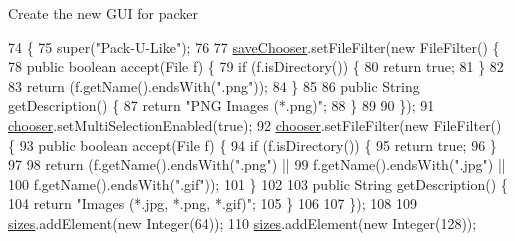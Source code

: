 Create the new G\+UI for packer 
\begin{DoxyCode}
74                     \{
75         super(\textcolor{stringliteral}{"Pack-U-Like"});
76         
77         \mbox{\hyperlink{classorg_1_1newdawn_1_1slick_1_1tools_1_1packulike_1_1_packer_a29ef57b7ec0b9ffa079a40890b9ac78b}{saveChooser}}.setFileFilter(\textcolor{keyword}{new} FileFilter() \{
78             \textcolor{keyword}{public} \textcolor{keywordtype}{boolean} accept(File f) \{
79                 \textcolor{keywordflow}{if} (f.isDirectory()) \{
80                     \textcolor{keywordflow}{return} \textcolor{keyword}{true};
81                 \}
82                 
83                 \textcolor{keywordflow}{return} (f.getName().endsWith(\textcolor{stringliteral}{".png"}));
84             \}
85 
86             \textcolor{keyword}{public} String getDescription() \{
87                 \textcolor{keywordflow}{return} \textcolor{stringliteral}{"PNG Images (*.png)"};
88             \}
89             
90         \});
91         \mbox{\hyperlink{classorg_1_1newdawn_1_1slick_1_1tools_1_1packulike_1_1_packer_aee4fbd6c801ae2b56690fc2994e73e52}{chooser}}.setMultiSelectionEnabled(\textcolor{keyword}{true});
92         \mbox{\hyperlink{classorg_1_1newdawn_1_1slick_1_1tools_1_1packulike_1_1_packer_aee4fbd6c801ae2b56690fc2994e73e52}{chooser}}.setFileFilter(\textcolor{keyword}{new} FileFilter() \{
93             \textcolor{keyword}{public} \textcolor{keywordtype}{boolean} accept(File f) \{
94                 \textcolor{keywordflow}{if} (f.isDirectory()) \{
95                     \textcolor{keywordflow}{return} \textcolor{keyword}{true};
96                 \}
97                 
98                 \textcolor{keywordflow}{return} (f.getName().endsWith(\textcolor{stringliteral}{".png"}) ||
99                         f.getName().endsWith(\textcolor{stringliteral}{".jpg"}) ||
100                         f.getName().endsWith(\textcolor{stringliteral}{".gif"}));
101             \}
102 
103             \textcolor{keyword}{public} String getDescription() \{
104                 \textcolor{keywordflow}{return} \textcolor{stringliteral}{"Images (*.jpg, *.png, *.gif)"};
105             \}
106             
107         \});
108         
109         \mbox{\hyperlink{classorg_1_1newdawn_1_1slick_1_1tools_1_1packulike_1_1_packer_a29634c52b37f367f3e1c6f534b690f2d}{sizes}}.addElement(\textcolor{keyword}{new} Integer(64));
110         \mbox{\hyperlink{classorg_1_1newdawn_1_1slick_1_1tools_1_1packulike_1_1_packer_a29634c52b37f367f3e1c6f534b690f2d}{sizes}}.addElement(\textcolor{keyword}{new} Integer(128));

\end{DoxyCode}
